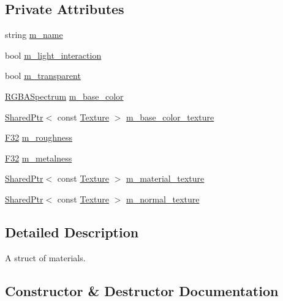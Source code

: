 \subsection*{Private Attributes}
\begin{DoxyCompactItemize}
\item 
string \hyperlink{structmage_1_1_material_a2b3e839a8ae093d53b12529d61ec6605}{m\+\_\+name}
\item 
bool \hyperlink{structmage_1_1_material_a636ddbd882e3ff2841c192c5ecbc5053}{m\+\_\+light\+\_\+interaction}
\item 
bool \hyperlink{structmage_1_1_material_abaaf4666e33f4a7952ef9d0801e3f199}{m\+\_\+transparent}
\item 
\hyperlink{structmage_1_1_r_g_b_a_spectrum}{R\+G\+B\+A\+Spectrum} \hyperlink{structmage_1_1_material_a3425f685923d7cf24117c93385122e4b}{m\+\_\+base\+\_\+color}
\item 
\hyperlink{namespacemage_a1e01ae66713838a7a67d30e44c67703e}{Shared\+Ptr}$<$ const \hyperlink{classmage_1_1_texture}{Texture} $>$ \hyperlink{structmage_1_1_material_ae3d40b79a275a212ea7068b0c3f8840c}{m\+\_\+base\+\_\+color\+\_\+texture}
\item 
\hyperlink{namespacemage_aa97e833b45f06d60a0a9c4fc22ae02c0}{F32} \hyperlink{structmage_1_1_material_a2a8a871ee6c18b68c33ce9cdfd23f15f}{m\+\_\+roughness}
\item 
\hyperlink{namespacemage_aa97e833b45f06d60a0a9c4fc22ae02c0}{F32} \hyperlink{structmage_1_1_material_a40b4b6c0e7b940bdf3764b21cb16fbfb}{m\+\_\+metalness}
\item 
\hyperlink{namespacemage_a1e01ae66713838a7a67d30e44c67703e}{Shared\+Ptr}$<$ const \hyperlink{classmage_1_1_texture}{Texture} $>$ \hyperlink{structmage_1_1_material_aedd606b3cc103ba756aaca9433da0794}{m\+\_\+material\+\_\+texture}
\item 
\hyperlink{namespacemage_a1e01ae66713838a7a67d30e44c67703e}{Shared\+Ptr}$<$ const \hyperlink{classmage_1_1_texture}{Texture} $>$ \hyperlink{structmage_1_1_material_adc2d9d68524a55262bd0f4832880b10b}{m\+\_\+normal\+\_\+texture}
\end{DoxyCompactItemize}


\subsection{Detailed Description}
A struct of materials. 

\subsection{Constructor \& Destructor Documentation}
\hypertarget{structmage_1_1_material_aedc095c81f55be41533dbdf69d36df84}{}\label{structmage_1_1_material_aedc095c81f55be41533dbdf69d36df84} 
